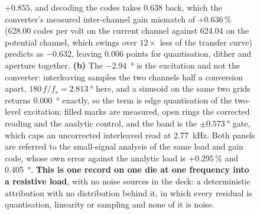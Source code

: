\begin{figure}[htbp]
{  \(+0.855\), and decoding the codes takes \(0.638\) back, which the
  converter's measured inter-channel gain mismatch of \(+0.636\,\%\)
  (\num{628.00} codes per volt on the current channel against \num{624.04} on
  the potential channel, which swings over \(12\times\) less of the transfer
  curve) predicts as \(-0.632\), leaving \num{0.006} points for quantisation,
  dither and aperture together. \textbf{(b)} The \SI{-2.94}{\degree} is the
  excitation and not the converter: interleaving samples the two channels half a
  conversion apart, \(180\,f/f_s = \SI{2.813}{\degree}\) here, and a sinusoid on
  the same two grids returns \SI{0.000}{\degree} exactly, so the term is edge
  quantisation of the two-level excitation; filled marks are measured, open
  rings the corrected reading and the analytic control, and the band is the
  \(\pm\SI{0.573}{\degree}\) gate, which caps an uncorrected interleaved read at
  \SI{2.77}{\kilo\hertz}. Both panels are referred to the small-signal analysis
  of the same load and gain code, whose own error against the analytic load is
  \(+0.295\,\%\) and \SI{0.405}{\degree}. \textbf{This is one record on one die
  at one frequency into a resistive load}, with no noise sources in the deck:
  a deterministic attribution with no distribution behind it, in which every
  residual is quantisation, linearity or sampling and none of it is noise.}
  \label{fig:eis-codelevel}
\end{figure}
